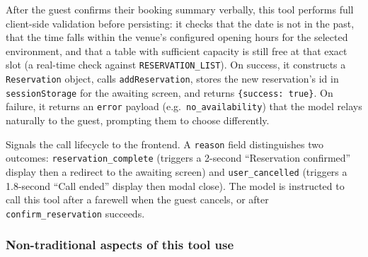 \documentclass[12pt,a4paper,oneside]{report}
\begin{document}
\begin{description}[leftmargin=2em, topsep=4pt, itemsep=6pt,
                    font=\bfseries\ttfamily]
  \item[confirm\_reservation]
    After the guest confirms their booking summary verbally, this tool
    performs full client-side validation before persisting: it checks that
    the date is not in the past, that the time falls within the venue's
    configured opening hours for the selected environment, and that a table with sufficient
    capacity is still free at that exact slot (a real-time check against
    \texttt{RESERVATION\_LIST}). On success, it constructs a
    \texttt{Reservation} object, calls \texttt{addReservation}, stores
    the new reservation's id in \texttt{sessionStorage} for the awaiting
    screen, and returns \texttt{\{success: true\}}. On failure, it returns
    an \texttt{error} payload (e.g.\ \texttt{no\_availability}) that the
    model relays naturally to the guest, prompting them to choose
    differently.

  \item[end\_call]
    Signals the call lifecycle to the frontend. A \texttt{reason} field
    distinguishes two outcomes: \texttt{reservation\_complete} (triggers
    a 2-second ``Reservation confirmed'' display then a redirect to the
    awaiting screen) and \texttt{user\_cancelled} (triggers a 1.8-second
    ``Call ended'' display then modal close). The model is instructed
    to call this tool after a farewell when the guest cancels, or after
    \texttt{confirm\_reservation} succeeds.
\end{description}

\subsubsection{Non-traditional aspects of this tool use}
\end{document}
